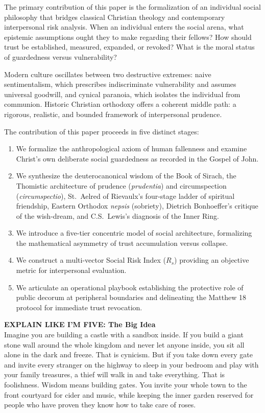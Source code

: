 \documentclass[11pt,twocolumn]{article}
\begin{document}
The primary contribution of this paper is the formalization of an individual social philosophy that bridges classical Christian theology and contemporary interpersonal risk analysis. When an individual enters the social arena, what epistemic assumptions ought they to make regarding their fellows? How should trust be established, measured, expanded, or revoked? What is the moral status of guardedness versus vulnerability? 

Modern culture oscillates between two destructive extremes: naive sentimentalism, which prescribes indiscriminate vulnerability and assumes universal goodwill, and cynical paranoia, which isolates the individual from communion. Historic Christian orthodoxy offers a coherent middle path: a rigorous, realistic, and bounded framework of interpersonal prudence.

The contribution of this paper proceeds in five distinct stages:
\begin{enumerate}
    \item We formalize the anthropological axiom of human fallenness and examine Christ's own deliberate social guardedness as recorded in the Gospel of John.
    \item We synthesize the deuterocanonical wisdom of the Book of Sirach, the Thomistic architecture of prudence (\textit{prudentia}) and circumspection (\textit{circumspectio}), St.~Aelred of Rievaulx's four-stage ladder of spiritual friendship, Eastern Orthodox \textit{nepsis} (sobriety), Dietrich Bonhoeffer's critique of the wish-dream, and C.S.~Lewis's diagnosis of the Inner Ring.
    \item We introduce a five-tier concentric model of social architecture, formalizing the mathematical asymmetry of trust accumulation versus collapse.
    \item We construct a multi-vector Social Risk Index ($R_s$) providing an objective metric for interpersonal evaluation.
    \item We articulate an operational playbook establishing the protective role of public decorum at peripheral boundaries and delineating the Matthew 18 protocol for immediate trust revocation.
\end{enumerate}

\begin{eli5box}
\textbf{EXPLAIN LIKE I'M FIVE: The Big Idea}\\
Imagine you are building a castle with a sandbox inside. If you build a giant stone wall around the whole kingdom and never let anyone inside, you sit all alone in the dark and freeze. That is cynicism. But if you take down every gate and invite every stranger on the highway to sleep in your bedroom and play with your family treasures, a thief will walk in and take everything. That is foolishness. Wisdom means building gates. You invite your whole town to the front courtyard for cider and music, while keeping the inner garden reserved for people who have proven they know how to take care of roses.
\end{eli5box}
\end{document}
